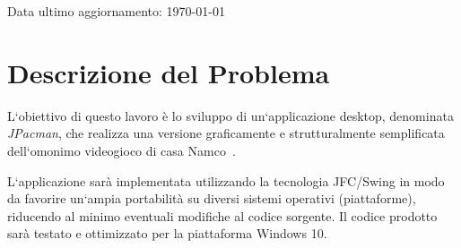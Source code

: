\documentclass[12pt,a4paper]{report}
\begin{document}
\begin{titlepage}

	\vfill
	\raggedright
	\small{Data ultimo aggiornamento: \today}
\end{titlepage}
\restoregeometry

\tableofcontents

\chapter{Descrizione del Problema}\label{ch:despro}
L`obiettivo di questo lavoro è lo sviluppo di un`applicazione desktop, denominata \emph{JPacman}, che realizza una versione graficamente e strutturalmente semplificata dell`omonimo videogioco di casa Namco~\cite{wiki:it:pacman,wiki:it:namco}.

L`applicazione sarà implementata utilizzando la tecnologia JFC/Swing in modo da favorire un`ampia portabilità su diversi sistemi operativi (piattaforme), riducendo al minimo eventuali modifiche al codice sorgente. Il codice prodotto sarà testato e ottimizzato per la piattaforma Windows 10.

\end{document}
